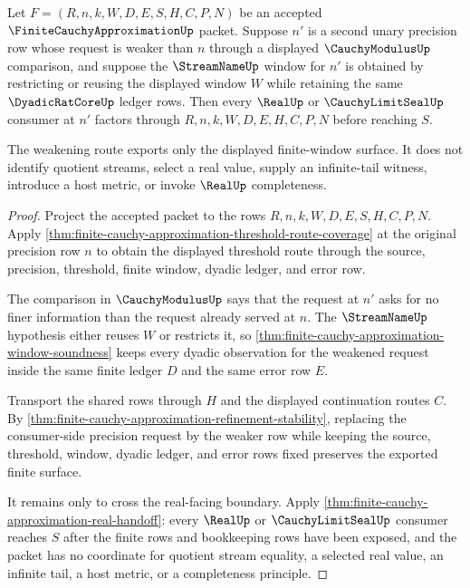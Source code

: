 \begin{theorem}
\label{thm:finite-cauchy-approximation-precision-weakening-route}
Let $F=(R,n,k,W,D,E,S,H,C,P,N)$ be an accepted $\FiniteCauchyApproximationUp$ packet. Suppose $n'$ is a second unary precision row whose request is weaker than $n$ through a displayed $\CauchyModulusUp$ comparison, and suppose the $\StreamNameUp$ window for $n'$ is obtained by restricting or reusing the displayed window $W$ while retaining the same $\DyadicRatCoreUp$ ledger rows. Then every $\RealUp$ or $\CauchyLimitSealUp$ consumer at $n'$ factors through $R,n,k,W,D,E,H,C,P,N$ before reaching $S$.

The weakening route exports only the displayed finite-window surface. It does not identify quotient streams, select a real value, supply an infinite-tail witness, introduce a host metric, or invoke $\RealUp$ completeness.
\end{theorem}
\begin{proof}
Project the accepted packet to the rows $R,n,k,W,D,E,S,H,C,P,N$. Apply \autoref{thm:finite-cauchy-approximation-threshold-route-coverage} at the original precision row $n$ to obtain the displayed threshold route through the source, precision, threshold, finite window, dyadic ledger, and error row.

The comparison in $\CauchyModulusUp$ says that the request at $n'$ asks for no finer information than the request already served at $n$. The $\StreamNameUp$ hypothesis either reuses $W$ or restricts it, so \autoref{thm:finite-cauchy-approximation-window-soundness} keeps every dyadic observation for the weakened request inside the same finite ledger $D$ and the same error row $E$.

Transport the shared rows through $H$ and the displayed continuation routes $C$. By \autoref{thm:finite-cauchy-approximation-refinement-stability}, replacing the consumer-side precision request by the weaker row while keeping the source, threshold, window, dyadic ledger, and error rows fixed preserves the exported finite surface.

It remains only to cross the real-facing boundary. Apply \autoref{thm:finite-cauchy-approximation-real-handoff}: every $\RealUp$ or $\CauchyLimitSealUp$ consumer reaches $S$ after the finite rows and bookkeeping rows have been exposed, and the packet has no coordinate for quotient stream equality, a selected real value, an infinite tail, a host metric, or a completeness principle.
\end{proof}

